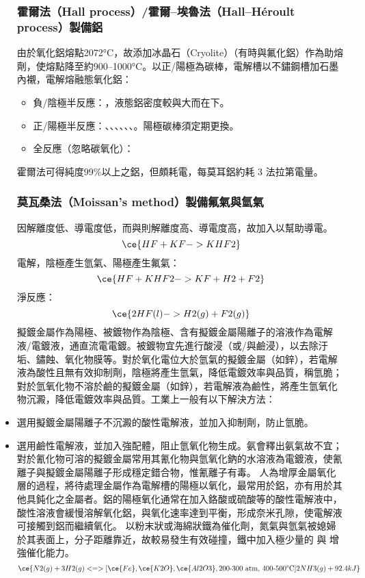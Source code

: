 \documentclass[a4paper,12pt]{report}
\begin{document}
\begin{itemize}
\subsubsection{霍爾法（Hall process）/霍爾–埃魯法（Hall–Héroult process）製備鋁}
由於氧化鋁熔點2072°C，故添加冰晶石（Cryolite）（有時與氟化鋁）作為助熔劑，使熔點降至約900–1000°C。以正/陽極為碳棒，電解槽以不鏽鋼槽加石墨內襯，電解熔融態氧化鋁：
\begin{itemize}
\item 負/陰極半反應：，液態鋁密度較與大而在下。
\item 正/陽極半反應：、、、、、、。陽極碳棒須定期更換。
\item 全反應（忽略碳氧化）：
\end{itemize}
霍爾法可得純度99\%以上之鋁，但頗耗電，每莫耳鋁約耗 3 法拉第電量。
\subsubsection{莫瓦桑法（Moissan's method）製備氟氣與氫氣}
因解離度低、導電度低，而與則解離度高、導電度高，故加入以幫助導電。
\[\ce{HF + KF -> KHF2}\]
電解，陰極產生氫氣、陽極產生氟氣：
\[\ce{HF + KHF2 -> KF + H2 + F2}\]
淨反應：
\[\ce{2HF(l) -> H2(g) + F2(g)}\]
擬鍍金屬作為陽極、被鍍物作為陰極、含有擬鍍金屬陽離子的溶液作為電解液/電鍍液，通直流電電鍍。被鍍物宜先進行酸浸（或/與鹼浸），以去除汙垢、鏽蝕、氧化物膜等。對於氧化電位大於氫氣的擬鍍金屬（如鋅），若電解液為酸性且無有效抑制劑，陰極將產生氫氣，降低電鍍效率與品質，稱氫脆；對於氫氧化物不溶於鹼的擬鍍金屬（如鋅），若電解液為鹼性，將產生氫氧化物沉澱，降低電鍍效率與品質。工業上一般有以下解決方法：
\bit
\item 選用擬鍍金屬陽離子不沉澱的酸性電解液，並加入抑制劑，防止氫脆。
\item 選用鹼性電解液，並加入強配體，阻止氫氧化物生成。氨會釋出氨氣故不宜；對於氰化物可溶的擬鍍金屬常用其氰化物與氫氧化鈉的水溶液為電鍍液，使氰離子與擬鍍金屬陽離子形成穩定錯合物，惟氰離子有毒。
\eit
{}
人為增厚金屬氧化層的過程，將待處理金屬作為電解槽的陽極以氧化，最常用於鋁，亦有用於其他具鈍化之金屬者。鋁的陽極氧化通常在加入鉻酸或硫酸等的酸性電解液中，酸性溶液會緩慢溶解氧化鋁，與氧化速率達到平衡，形成奈米孔隙，使電解液可接觸到鋁而繼續氧化。
以粉末狀或海綿狀鐵為催化劑，氮氣與氫氣被媳婦於其表面上，分子距離靠近，故較易發生有效碰撞，鐵中加入極少量的 與 增強催化能力。
\[\ce{N2(g) + 3H2(g) <=>[\ce{Fe}, \ce{K2O}, \ce{Al2O3}, \text{200-300 atm, 400-500°C}] 2NH3(g) + 92.4kJ}\]

\end{itemize}
\end{document}
